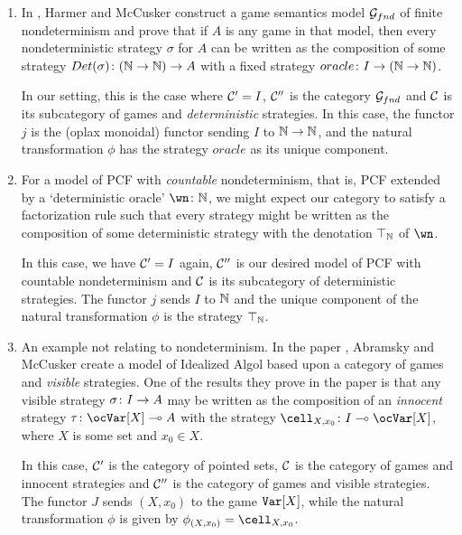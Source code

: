 \documentclass{article}
\begin{document}
\begin{example}
  \begin{enumerate}
    \item In \cite{mcCHFiniteND}, Harmer and McCusker construct a game semantics model $\mathcal G_{fnd}$ of finite nondeterminism and prove that if $A$ is any game in that model, then every nondeterministic strategy $\sigma$ for $A$ can be written as the composition of some strategy $Det(\sigma)\colon (\mathbb{N}\to\mathbb{N})\to A$ with a fixed strategy $oracle\colon I\to(\mathbb{N}\to\mathbb{N})$.  
      
      In our setting, this is the case where ${\mathcal{C}}'=I$, ${\mathcal{C}}''$ is the category $\mathcal G_{fnd}$ and ${\mathcal{C}}$ is its subcategory of games and \emph{deterministic} strategies.  
      In this case, the functor $j$ is the (oplax monoidal) functor sending $I$ to $\mathbb{N}\to\mathbb{N}$, and the natural transformation $\phi$ has the strategy $oracle$ as its unique component.

    \item For a model of PCF with \emph{countable} nondeterminism, that is, PCF extended by a `deterministic oracle' $\wn\from\bN$, we might expect our category to satisfy a factorization rule such that every strategy might be written as the composition of some deterministic strategy with the denotation $\top_{\mathbb{N}}$ of $\wn$.  

      In this case, we have ${\mathcal{C}}'=I$ again, ${\mathcal{C}}''$ is our desired model of PCF with countable nondeterminism and ${\mathcal{C}}$ is its subcategory of deterministic strategies.  
      The functor $j$ sends $I$ to $\mathbb{N}$ and the unique component of the natural transformation $\phi$ is the strategy $\top_{\mathbb{N}}$.  

    \item An example not relating to nondeterminism.  
      In the paper \cite{SamsonGuyIAPassive}, Abramsky and McCusker create a model of Idealized Algol based upon a category of games and \emph{visible} strategies.  
      One of the results they prove in the paper is that any visible strategy $\sigma\colon I\to A$ may be written as the composition of an \emph{innocent} strategy $\tau\from \oc\Var[X]\implies A$ with the strategy $\cell_{X,x_0}\from I\implies\oc\Var[X]$, where $X$ is some set and $x_0\in X$.

      In this case, ${\mathcal{C}}'$ is the category of pointed sets, ${\mathcal{C}}$ is the category of games and innocent strategies and ${\mathcal{C}}''$ is the category of games and visible strategies.  
      The functor $J$ sends $(X, x_0)$ to the game ${\mathtt{Var}}[X]$, while the natural transformation $\phi$ is given by $\phi_{(X, x_0)} = \cell_{X,x_0}$.
  \end{enumerate}
\end{example}
\end{document}
